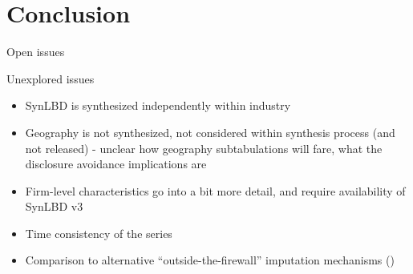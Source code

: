 %

















\section{Conclusion}

\begin{frame}{Open issues}
\begin{block}{Unexplored issues}
\begin{itemize}[<+->]
\item SynLBD is synthesized independently within industry
\item Geography is not synthesized, not considered within synthesis process (and not released) 
- unclear how geography subtabulations will fare, what the disclosure avoidance implications are
\item Firm-level characteristics go into a bit more detail, and require availability of SynLBD v3
\item Time consistency of the series
\item Comparison to alternative ``outside-the-firewall'' imputation mechanisms 
(\cite{HolanEtAl2010,BradleyEtAl2014})
\end{itemize}
\end{block}
\end{frame}

